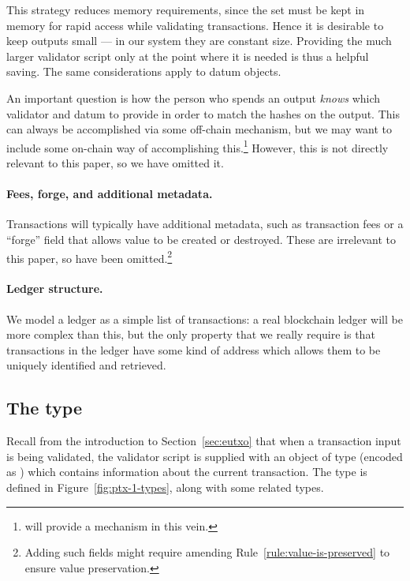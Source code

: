 This strategy reduces memory requirements, since
the \UTXO{} set must be kept in memory for rapid access while validating
transactions. Hence it is desirable to keep outputs small --- in
our system they are constant size.
Providing the much larger validator script only at the point where it is needed
is thus a helpful saving. The same considerations apply to datum objects.

An important question is how the person who spends an output \emph{knows} which
validator and datum to provide in order to match the hashes on the output.
This can always be accomplished via some off-chain mechanism, but we may
want to include some on-chain way of accomplishing this.\footnote{\Cardano{} will provide
a mechanism in this vein.} However, this is not directly relevant to this paper,
so we have omitted it.

\paragraph{Fees, forge, and additional metadata.}  Transactions will typically
have additional metadata, such as transaction fees or a ``forge''
field that allows value to be created or destroyed. These are
irrelevant to this paper, so have been omitted.\footnote{ Adding such
  fields might require amending Rule~\ref{rule:value-is-preserved}
  to ensure value preservation.  }

\paragraph{Ledger structure.} We model a ledger as a simple
list of transactions: a real blockchain ledger will be more complex
than this, but the only property that we really require is that
transactions in the ledger have some kind of address which allows them
to be uniquely identified and retrieved.

\subsection{The \ctx{} type}
\label{sec:validation-context}
Recall from the introduction to Section~\ref{sec:eutxo} that when a
transaction input is being validated, the validator script is supplied
with an object of type \ctx{} (encoded as \Data{}) which contains
information about the current transaction.  The \ctx{} type is defined
in Figure~\ref{fig:ptx-1-types}, along with some related types.

